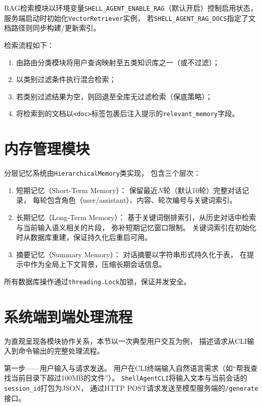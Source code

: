 RAG检索模块以环境变量\texttt{SHELL\_AGENT\_ENABLE\_RAG}（默认开启）控制启用状态，
服务端启动时初始化\texttt{VectorRetriever}实例，
若\texttt{SHELL\_AGENT\_RAG\_DOCS}指定了文档路径则同步构建/更新索引。

检索流程如下：
\begin{enumerate}
    \item 由路由分类模块将用户查询映射至五类知识库之一（或不过滤）；
    \item 以类别过滤条件执行混合检索；
    \item 若类别过滤结果为空，则回退至全库无过滤检索（保底策略）；
    \item 将检索到的文档以\texttt{<doc>}标签包裹后注入提示的\texttt{relevant\_memory}字段。
\end{enumerate}

\section{内存管理模块}

分层记忆系统由\texttt{HierarchicalMemory}类实现，
包含三个层次：

\begin{enumerate}
    \item 短期记忆（Short-Term Memory）：
    保留最近$N$轮（默认10轮）完整对话记录，
    每轮包含角色（user/assistant）、内容、轮次编号与关键词索引。

    \item 长期记忆（Long-Term Memory）：
    基于关键词倒排索引，从历史对话中检索与当前输入语义相关的片段，
    弥补短期记忆窗口限制。
    关键词索引在初始化时从数据库重建，保证持久化后重启可用。

    \item 摘要记忆（Summary Memory）：
    对话摘要以字符串形式持久化于表，
    在提示中作为全局上下文背景，压缩长期会话信息。
\end{enumerate}

所有数据库操作通过\texttt{threading.Lock}加锁，保证并发安全。

\section{系统端到端处理流程}

为直观呈现各模块协作关系，本节以一次典型用户交互为例，
描述请求从CLI输入到命令输出的完整处理流程。

第一步——用户输入与请求发送。
用户在CLI终端输入自然语言需求（如“帮我查找当前目录下超过100MB的文件”）。
\texttt{ShellAgentCLI}将输入文本与当前会话的\texttt{session\_id}打包为JSON，
通过HTTP POST请求发送至模型服务端的\texttt{/generate}接口。

